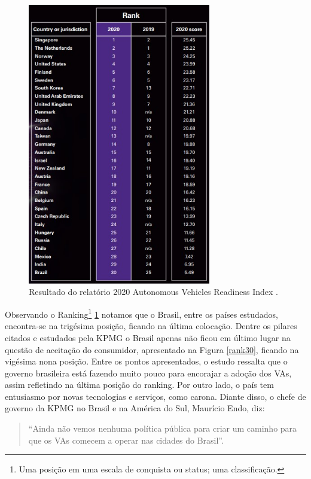 \begin{figure}[H]
\centering
\includegraphics[width=8cm]{Figures/rank.jpg}
\caption{Resultado do relatório 2020 Autonomous Vehicles Readiness Index \cite{KPMG}.}
\label{KPMG}
\end{figure}

Observando o Ranking\footnote{Uma posição em uma escala de conquista ou status; uma classificação.} \ref{KPMG} notamos que o Brasil, entre os países estudados, encontra-se na trigésima posição, ficando na última colocação. Dentre os pilares citados e estudados pela KPMG o Brasil apenas não ficou em último lugar na questão de aceitação do consumidor, apresentado na Figura \ref{rank30}, ficando na vigésima nona posição.
Entre os pontos apresentados, o estudo ressalta que o governo brasileira está fazendo muito pouco para encorajar a adoção dos VAs, assim refletindo na última posição do ranking. Por outro lado, o país tem entusiasmo por novas tecnologias e serviços, como carona. Diante disso, o chefe de governo da KPMG no Brasil e na América do Sul, Maurício Endo, diz:
\begin{quote}
    
“Ainda não vemos nenhuma política pública para criar um caminho para que os VAs comecem a operar nas cidades do Brasil”.
\end{quote}

